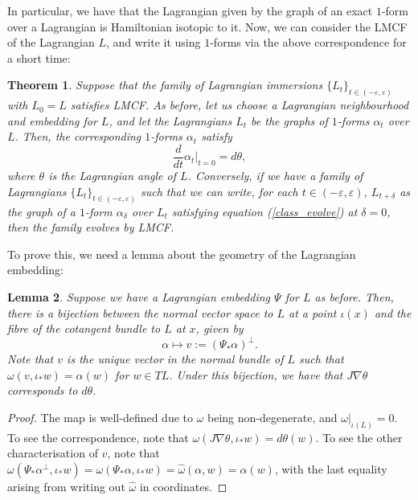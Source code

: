 \documentclass[10pt, a4paper]{article}
\theoremstyle{plain}%
\newtheorem{theorem}{Theorem}[section]
\newtheorem{lem}[theorem]{Lemma}
\theoremstyle{definition}
\numberwithin{figure}{section}
\numberwithin{equation}{section}
\begin{document}
In particular, we have that the Lagrangian given by the graph of an exact $1$-form over a Lagrangian is Hamiltonian isotopic to it. Now, we can consider the LMCF of the Lagrangian $L$, and write it using $1$-forms via the above correspondence for a short time:
\begin{theorem}\label{thm_mcfpot}
	Suppose that the family of Lagrangian immersions $\{L_t\}_{t\in(-\varepsilon,\varepsilon)}$ with $L_0=L$ satisfies LMCF. As before, let us choose a Lagrangian neighbourhood and embedding for $L$, and let the Lagrangians $L_t$ be the graphs of $1$-forms $\alpha_t$ over $L$. Then, the corresponding $1$-forms $\alpha_t$ satisfy \begin{equation}\label{class_evolve}
		\frac{d}{dt}\alpha_t\Big|_{t=0}  = d\theta,
	\end{equation}
	where $\theta$ is the Lagrangian angle of $L$. Conversely, if we have a family of Lagrangians $\{L_t\}_{t\in(-\varepsilon,\varepsilon)}$ such that we can write, for each $t\in(-\varepsilon,\varepsilon)$, $L_{t+\delta}$ as the graph of a $1$-form $\alpha_{\delta}$ over $L_t$ satisfying equation (\ref{class_evolve}) at $\delta=0$, then the family evolves by LMCF.
\end{theorem}

To prove this, we need a lemma about the geometry of the Lagrangian embedding:
\begin{lem}
	Suppose we have a Lagrangian embedding $\Psi$ for $L$ as before. Then, there is a bijection between the normal vector space to $L$ at a point $\iota(x)$ and the fibre of the cotangent bundle to $L$ at $x$, given by 
	\begin{equation}\label{eq_normalisomorphism}
		\alpha \mapsto v := (\Psi_*\alpha)^\perp.
	\end{equation}
	Note that $v$ is the unique vector in the normal bundle of $L$ such that $\omega(v,\iota_*w)=\alpha(w)$ for $w\in TL$. Under this bijection, we have that $J\nabla\theta$ corresponds to $d\theta$.
\end{lem}
\begin{proof}
	The map is well-defined due to $\omega$ being non-degenerate, and $\omega|_{\iota(L)}=0$. To see the correspondence, note that $\omega(J\nabla\theta,\iota_*w) = d\theta(w)$. To see the other characterisation of $v$, note that $\omega(\Psi_*\alpha^\perp,\iota_*w) = \omega(\Psi_*\alpha,\iota_*w) = \widehat{\omega}(\alpha,w) = \alpha(w)$, with the last equality arising from writing out $\widehat{\omega}$ in coordinates.
\end{proof}
\end{document}
